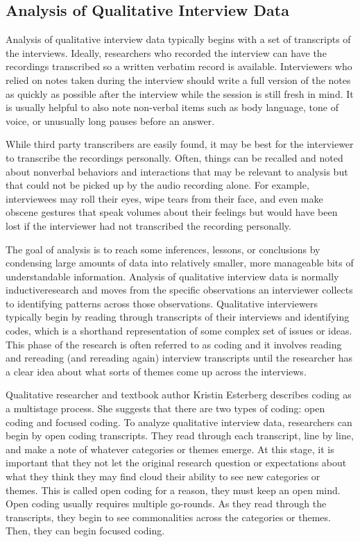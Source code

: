 \subsection{Analysis of Qualitative Interview Data}

Analysis of qualitative interview data typically begins with a set of transcripts of the interviews. Ideally, researchers who recorded the interview can have the recordings transcribed so a written verbatim record is available. Interviewers who relied on notes taken during the interview should write a full version of the notes as quickly as possible after the interview while the session is still fresh in mind. It is usually helpful to also note non-verbal items such as body language, tone of voice, or unusually long pauses before an answer.  

While third party transcribers are easily found, it may be best for the interviewer to transcribe the recordings personally. Often, things can be recalled and noted about nonverbal behaviors and interactions that may be relevant to analysis but that could not be picked up by the audio recording alone. For example, interviewees may roll their eyes, wipe tears from their face, and even make obscene gestures that speak volumes about their feelings but would have been lost if the interviewer had not transcribed the recording personally.

The goal of analysis is to reach some inferences, lessons, or conclusions by condensing large amounts of data into relatively smaller, more manageable bits of understandable information. Analysis of qualitative interview data is normally \gls{inductiveresearch} and moves from the specific observations an interviewer collects to identifying patterns across those observations. Qualitative interviewers typically begin by reading through transcripts of their interviews and identifying codes, which is a shorthand representation of some  complex set of issues or ideas. This phase of the research is often referred to as coding and it involves reading and rereading (and rereading again) interview transcripts until the researcher has a clear idea about what sorts of themes come up across the interviews.

Qualitative researcher and textbook author Kristin Esterberg\cite{esterberg2002qualitative} describes coding as a multistage process. She suggests that there are two types of coding: open coding and focused coding. To analyze qualitative interview data, researchers can begin by open coding transcripts. They read through each transcript, line by line, and make a note of whatever categories or themes emerge. At this stage, it is important that they not let the original research question or expectations about what they think they may find cloud their ability to see new categories or themes. This is called open coding for a reason, they must keep an open mind. Open coding usually requires multiple go-rounds. As they read through the transcripts, they begin to see commonalities across the categories or themes. Then, they can begin focused coding.

